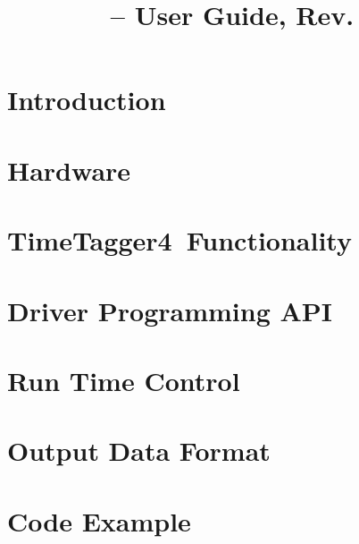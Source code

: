 \documentclass[12pt,notitlepage,a4paper]{report}
\title{\deviceName{} -- User Guide, Rev. \ugrev}
\newcommand{\deviceName}{TimeTagger4}%
\newcommand{\itett}[2]{#1}
\newcommand{\itett}[2]{#2}
\newcommand{\ifxHPTDC}[2]{#1}
\newcommand{\ifxHPTDC}[2]{#2}
\newcommand{\ttinput}[1]{}
\newcommand{\titlefile}{"figures/TT4_title.pdf"}
\newcommand{\ttinput}[1]{}
\newcommand{\titlefile}{"figures/xTDC4_title.pdf"}
\newcommand{\ttinput}[1]{}
\newcommand{\titlefile}{figures/xHPTDC8_title.pdf}
\begin{document}
\RaggedRight
\sloppy %
\clearpage
\tableofcontents
\clearpage

% 
    \chapter{Introduction}
        \ttinput{Intro.tex}

    \chapter{Hardware}  
        

    \chapter{\deviceName\ Functionality}
         
        
        
        \itett{
            
        }{}

    \chapter{Driver Programming API\label{cp:api}} 
          
          
    \chapter{Run Time Control\label{cp:readout}}  %
        \ifxHPTDC{
            
        }{
            
        } 

    \chapter{Output Data Format\label{cp:packetformat}} 
        
        \ifxHPTDC{
             
        }{
            
        }  
 
    \chapter{Code Example}  
        
\end{document}
